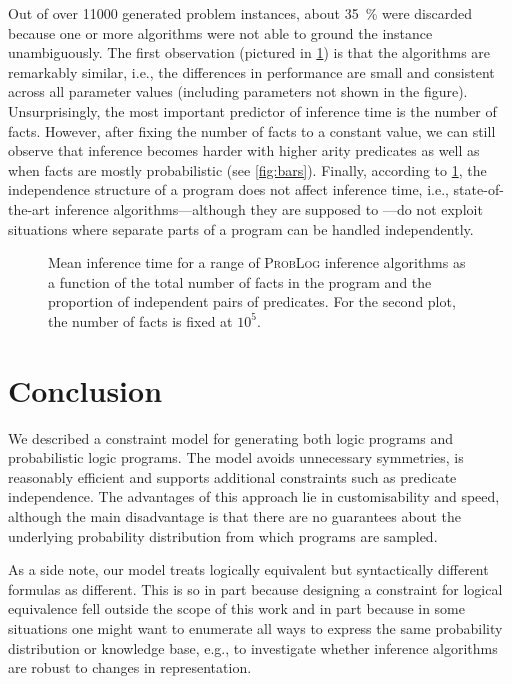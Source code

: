 \documentclass[runningheads]{llncs}
\begin{document}
Out of over \num{11000} generated problem instances, about \SI{35}{\percent} were
discarded because one or more algorithms were not able to ground the instance
unambiguously. The first observation (pictured in \cref{fig:line_plots}) is that
the algorithms are remarkably similar, i.e., the differences in performance are
small and consistent across all parameter values (including parameters not shown
in the figure). Unsurprisingly, the most important predictor of inference time
is the number of facts. However, after fixing the number of facts to a constant
value, we can still observe that inference becomes harder with higher arity
predicates as well as when facts are mostly probabilistic (see \cref{fig:bars}).
Finally, according to \cref{fig:line_plots}, the independence structure of a
program does not affect inference time, i.e., state-of-the-art inference
algorithms---although they are supposed to
\cite{DBLP:conf/uai/FierensBTGR11}---do not exploit situations where separate
parts of a program can be handled independently.

\begin{figure}[t]
  \centering
  \caption{Mean inference time for a range of \textsc{ProbLog} inference
    algorithms as a function of the total number of facts in the program and the
    proportion of independent pairs of predicates. For the second plot, the
    number of facts is fixed at $10^5$.}
  \label{fig:line_plots}
\end{figure}

\section{Conclusion}

We described a constraint model for generating both logic programs and
probabilistic logic programs. The model avoids unnecessary symmetries, is
reasonably efficient and supports additional constraints such as predicate
independence. The advantages of this approach lie in customisability and speed,
although the main disadvantage is that there are no guarantees about the
underlying probability distribution from which programs are sampled.

As a side note, our model treats logically equivalent but syntactically
different formulas as different. This is so in part because designing a
constraint for logical equivalence fell outside the scope of this work and in
part because in some situations one might want to enumerate all ways to express
the same probability distribution or knowledge base, e.g., to investigate
whether inference algorithms are robust to changes in representation.
\end{document}
